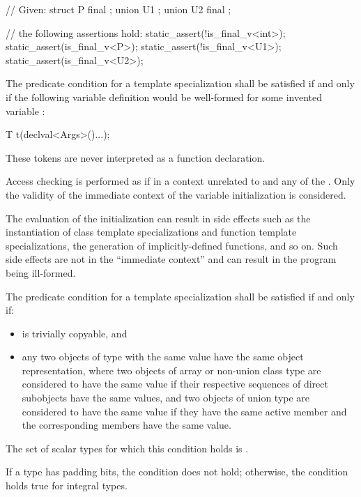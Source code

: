 \pnum
\begin{example}
\begin{codeblock}
// Given:
struct P final { };
union U1 { };
union U2 final { };

// the following assertions hold:
static_assert(!is_final_v<int>);
static_assert(is_final_v<P>);
static_assert(!is_final_v<U1>);
static_assert(is_final_v<U2>);
\end{codeblock}
\end{example}

%
\pnum
The predicate condition for a template specialization
 shall be satisfied if and only if the
following variable definition would be well-formed for some invented variable :

\begin{codeblock}
T t(declval<Args>()...);
\end{codeblock}

\begin{note}
These tokens are never interpreted as a function declaration.
\end{note}
Access checking is performed as if in a context unrelated to 
and any of the . Only the validity of the immediate context of the
variable initialization is considered.
\begin{note}
The evaluation of the
initialization can result in side effects such as the instantiation of class
template specializations and function template specializations, the generation
of implicitly-defined functions, and so on. Such side effects are not in the
``immediate context'' and can result in the program being ill-formed.
\end{note}

%
\pnum
The predicate condition for a template specialization
shall be satisfied if and only if:
\begin{itemize}
\item {} is trivially copyable, and
\item any two objects of type  with the same value
have the same object representation, where
two objects of array or non-union class type are considered to have the same value
if their respective sequences of direct subobjects have the same values, and
two objects of union type are considered to have the same value
if they have the same active member and the corresponding members have the same value.
\end{itemize}
The set of scalar types for which this condition holds is
.
\begin{note}
If a type has padding bits, the condition does not hold;
otherwise, the condition holds true for integral types.
\end{note}


